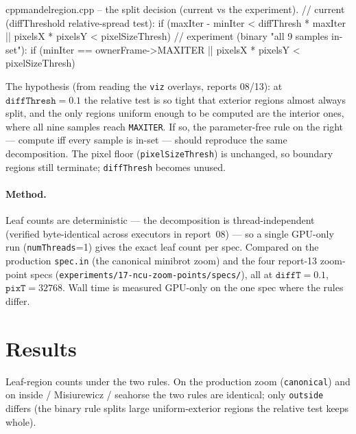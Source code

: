 \documentclass[
	english,
	letterpaper, oneside
]{article}
\begin{document}
\begin{sourcecode}{cpp}{mandelregion.cpp -- the split decision (current vs the experiment).}
// current (diffThreshold relative-spread test):
if (maxIter - minIter < diffThresh * maxIter || pixelsX * pixelsY < pixelSizeThresh)
// experiment (binary "all 9 samples in-set"):
if (minIter == ownerFrame->MAXITER       || pixelsX * pixelsY < pixelSizeThresh)
\end{sourcecode}

The hypothesis (from reading the \texttt{viz} overlays, reports 08/13): at
$\texttt{diffThresh}=0.1$ the relative test is so tight that exterior regions
almost always split, and the only regions uniform enough to be computed are the
interior ones, where all nine samples reach \texttt{MAXITER}. If so, the
parameter-free rule on the right --- compute iff every sample is in-set --- should
reproduce the same decomposition. The pixel floor (\texttt{pixelSizeThresh}) is
unchanged, so boundary regions still terminate; \texttt{diffThresh} becomes unused.

\paragraph{Method.} Leaf counts are deterministic --- the decomposition is
thread-independent (verified byte-identical across executors in report~08) --- so
a single GPU-only run (\texttt{numThreads}=1) gives the exact leaf count per spec.
Compared on the production \texttt{spec.in} (the canonical minibrot zoom) and the
four report-13 zoom-point specs (\texttt{experiments/17-ncu-zoom-points/specs/}),
all at $\texttt{diffT}=0.1$, $\texttt{pixT}=32768$. Wall time is measured GPU-only
on the one spec where the rules differ.

\section{Results}

            {Leaf-region counts under the two rules. On the production zoom
             (\texttt{canonical}) and on inside / Misiurewicz / seahorse the two
             rules are identical; only \texttt{outside} differs (the binary
             rule splits large uniform-exterior regions the relative test keeps
             whole). \label{fig:leaves}}
\end{document}
